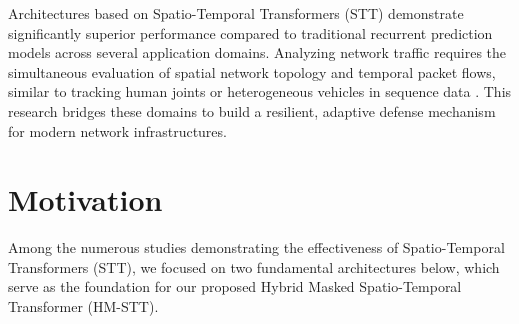 \documentclass[12pt, a4paper]{report}
\begin{document}
Architectures based on Spatio-Temporal Transformers (STT) demonstrate significantly superior performance compared to traditional recurrent prediction models across several application domains. Analyzing network traffic requires the simultaneous evaluation of spatial network topology and temporal packet flows, similar to tracking human joints \cite{aksan2020spatio} or heterogeneous vehicles in sequence data \cite{s2tnet2021}. This research bridges these domains to build a resilient, adaptive defense mechanism for modern network infrastructures.


\section*{Motivation}
Among the numerous studies demonstrating the effectiveness of Spatio-Temporal Transformers (STT), we focused on two fundamental architectures below, which serve as the foundation for our proposed Hybrid Masked Spatio-Temporal Transformer (HM-STT). 
\end{document}
